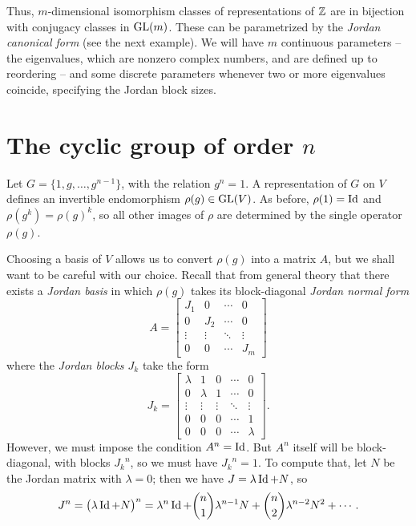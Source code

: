 Thus, \(m\)-dimensional isomorphism classes of representations of \(\mathbb{Z}\)
are in bijection with conjugacy classes in \(\operatorname{GL}(m)\). These can be
parametrized by the \emph{Jordan canonical form} (see the next
example). We will have \(m\) continuous parameters -- the eigenvalues,
which are nonzero complex numbers, and are defined up to reordering -- and
some discrete parameters whenever two or more eigenvalues coincide,
specifying the Jordan block sizes.

\section{The cyclic group of order \(n\)}
Let \(G=\{1,g,\dotsc,g^{n-1}\}\), with the relation \(g^n=1\). A
representation of \(G\) on \(V\) defines an invertible endomorphism
\(\rho(g)\in \operatorname{GL}(V)\). As before, \(\rho(1)=\operatorname{Id}\) and
\(\rho(g^k)=\rho(g)^k\), so all other images of \(\rho\) are determined by
the single operator \(\rho(g)\).

Choosing a basis of \(V\) allows us to convert \(\rho(g)\) into a matrix
\(A\), but we shall want to be careful with our choice. Recall that from
general theory that there exists a \emph{Jordan basis} in which \(\rho(g)\)
takes its block-diagonal \emph{Jordan normal form}
\[
  A=
  \begin{bmatrix}
    J_1&0&\cdots&0\\
    0&J_2&\cdots&0\\
    \vdots&\vdots&\ddots&\vdots\\
    0&0&\cdots&J_m
  \end{bmatrix}
\]
where the \emph{Jordan blocks \(J_k\)} take the form
\[
J_k=
\begin{bmatrix}
  \lambda&1&0&\cdots&0\\
  0&\lambda&1&\cdots&0\\
  \vdots&\vdots&\vdots&\ddots&\vdots\\
  0&0&0&\cdots&1\\
  0&0&0&\cdots&\lambda
\end{bmatrix}.
\]
However, we must impose the condition \(A^n=\operatorname{Id}\). But \(A^n\) itself will
be block-diagonal, with blocks \({J_k}^n\), so we must have
\({J_k}^n=1\). To compute that, let \(N\) be the Jordan matrix with
\(\lambda=0\); then we have \(J=\lambda\operatorname{Id}+N\), so
\[
J^n=\bigl(\lambda\operatorname{Id}+N\bigr)^n=\lambda^n\operatorname{Id}+\binom{n}{1}\lambda^{n-1}N+\binom{n}{2}\lambda^{n-2}N^2+\dotsb.
\]

